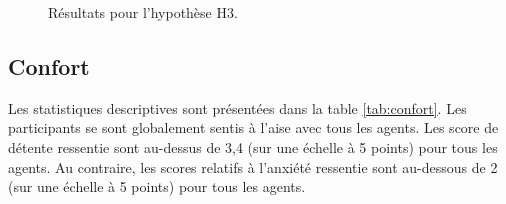 	\begin{figure}[h]
		
		
		
		\caption{Résultats pour l'hypothèse H3.}
		\label{fig:tour}
	\end{figure}
	
	
	\subsection{Confort}
	
	Les statistiques descriptives sont présentées dans la table \ref{tab:confort}. Les participants se sont globalement sentis à l'aise avec tous les agents.
	Les score de détente ressentie sont au-dessus de 3,4 (sur une échelle à 5 points) pour tous les agents. Au contraire, les scores relatifs à l'anxiété  ressentie sont au-dessous de 2 (sur une échelle à 5 points) pour tous les agents. 
	
